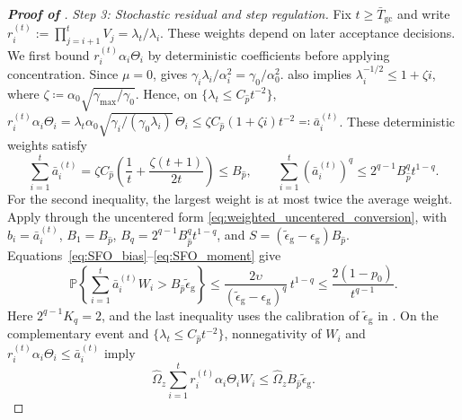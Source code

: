 \documentclass{article}
\begin{document}
\begin{proof}[\textbf{Proof of }]
\par\smallskip
\noindent\emph{Step 3: Stochastic residual and step regulation.}
Fix $t\ge\bar T_{\mathrm{gc}}$ and write $r_i^{(t)}:=\prod_{j=i+1}^tV_j=\lambda_t/\lambda_i$. These weights depend on later acceptance decisions. We first bound $r_i^{(t)}\alpha_i\Theta_i$ by deterministic coefficients before applying concentration. Since $\mu=0$,  gives $\gamma_i\lambda_i/\alpha_i^2=\gamma_0/\alpha_0^2$.  also implies
\(\lambda_i^{-1/2}\le1+\zeta i\), where
\(\zeta\coloneqq \alpha_0\sqrt{\gamma_{\max}/\gamma_0}\).
Hence, on \(\{\lambda_t\le C_{\hat p}t^{-2}\}\), $r_i^{(t)}\alpha_i\Theta_i=
\lambda_t\alpha_0\sqrt{\gamma_i/(\gamma_0\lambda_i)}\,\Theta_i
\le\zeta C_{\hat p}(1+\zeta i)t^{-2}
\eqqcolon \bar a_i^{(t)}$.
These deterministic weights satisfy
\begin{equation}\label{eq:weights_mu_zero_sfo}
\sum_{i=1}^t\bar a_i^{(t)}
=\zeta C_{\hat p}\left(\frac1t+\frac{\zeta(t+1)}{2t}\right)
\le B_{\hat p},\qquad
\sum_{i=1}^t(\bar a_i^{(t)})^q
\le2^{q-1}B_{\hat p}^qt^{1-q}.
\end{equation}
For the second inequality, the largest weight is at most twice the
average weight. Apply  through
the uncentered form \eqref{eq:weighted_uncentered_conversion}, with
\(b_i=\bar a_i^{(t)}\), \(B_1=B_{\hat p}\),
\(B_q=2^{q-1}B_{\hat p}^qt^{1-q}\), and
\(S=(\widetilde\epsilon_{\mathrm{g}}-\epsilon_{\mathrm{g}})B_{\hat p}\).
Equations~\eqref{eq:SFO_bias}--\eqref{eq:SFO_moment} give
\begin{equation}\label{eq:regulated_weighted_error_mu_zero_sfo}
\mathbb P\left\{\sum_{i=1}^t\bar a_i^{(t)}W_i
>B_{\hat p}\widetilde\epsilon_{\mathrm{g}}\right\}
\le\frac{2\upsilon}
{(\widetilde\epsilon_{\mathrm{g}}-\epsilon_{\mathrm{g}})^q}\,t^{1-q}
\le\frac{2(1-p_0)}{t^{q-1}}.
\end{equation}
Here \(2^{q-1}K_q=2\), and the last inequality uses the calibration
of \(\widetilde\epsilon_{\mathrm{g}}\) in .
On the complementary event and
\(\{\lambda_t\le C_{\hat p}t^{-2}\}\), nonnegativity of \(W_i\)
and \(r_i^{(t)}\alpha_i\Theta_i\le\bar a_i^{(t)}\) imply
\begin{equation}\label{eq:regulated_stochastic_residual_bound}
\textstyle \widehat\Omega_z\sum_{i=1}^tr_i^{(t)}\alpha_i\Theta_i W_i
\le\widehat\Omega_zB_{\hat p}\widetilde\epsilon_{\mathrm{g}}.
\end{equation}


\end{proof}
\end{document}
